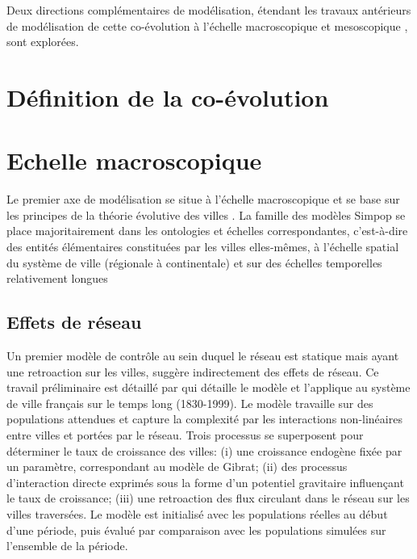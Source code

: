 \documentclass[11pt]{article}
\begin{document}

Deux directions complémentaires de modélisation, étendant les travaux antérieurs de modélisation de cette co-évolution à l'échelle macroscopique \citep{baptistemodeling,schmitt2014modelisation} et mesoscopique \citep{raimbault2014hybrid}, sont explorées.



\section{Définition de la co-évolution}




\section{Echelle macroscopique}

Le premier axe de modélisation se situe à l'échelle macroscopique et se base sur les principes de la théorie évolutive des villes \citep{pumain1997pour}. La famille des modèles Simpop se place majoritairement dans les ontologies et échelles correspondantes, c'est-à-dire des entités élémentaires constituées par les villes elles-mêmes, à l'échelle spatial du système de ville (régionale à continentale) et sur des échelles temporelles relativement longues


\subsection{Effets de réseau}

Un premier modèle de contrôle au sein duquel le réseau est statique mais ayant une retroaction sur les villes, suggère indirectement des effets de réseau. Ce travail préliminaire est détaillé par \cite{raimbault2018indirect} qui détaille le modèle et l'applique au système de ville français sur le temps long (1830-1999). Le modèle travaille sur des populations attendues et capture la complexité par les interactions non-linéaires entre villes et portées par le réseau. Trois processus se superposent pour déterminer le taux de croissance des villes: (i) une croissance endogène fixée par un paramètre, correspondant au modèle de Gibrat; (ii) des processus d'interaction directe exprimés sous la forme d'un potentiel gravitaire influençant le taux de croissance; (iii) une retroaction des flux circulant dans le réseau sur les villes traversées. Le modèle est initialisé avec les populations réelles au début d'une période, puis évalué par comparaison avec les populations simulées sur l'ensemble de la période.
\end{document}
